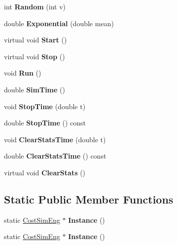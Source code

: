 \begin{DoxyCompactItemize}
int {\bfseries Random} (int v)
\item 
\mbox{\label{classCostSimEng_acc1720c9cdb5febb82759e3548626f0c}} 
double {\bfseries Exponential} (double mean)
\item 
\mbox{\label{classCostSimEng_a99c79de92c4bd410b243c6e9245ebbdf}} 
virtual void {\bfseries Start} ()
\item 
\mbox{\label{classCostSimEng_af799df40b1a3bd7de06b31e4927d5b26}} 
virtual void {\bfseries Stop} ()
\item 
\mbox{\label{classCostSimEng_ae79fd3ec1d850a585d832ef41a0471e5}} 
void {\bfseries Run} ()
\item 
\mbox{\label{classCostSimEng_a874b89eda70f909bd008b9fb4b8847ea}} 
double {\bfseries Sim\+Time} ()
\item 
\mbox{\label{classCostSimEng_a942ec6fc1324614d65f8e18231230990}} 
void {\bfseries Stop\+Time} (double t)
\item 
\mbox{\label{classCostSimEng_a79440b2e2468c8996e24b4a60099d33b}} 
double {\bfseries Stop\+Time} () const
\item 
\mbox{\label{classCostSimEng_a80691746a7c7edb5d12de3d879e3266c}} 
void {\bfseries Clear\+Stats\+Time} (double t)
\item 
\mbox{\label{classCostSimEng_a58be6ebd56f080abf5607c09f99a0f30}} 
double {\bfseries Clear\+Stats\+Time} () const
\item 
\mbox{\label{classCostSimEng_a431e85fcd9c3b40aa8cfc53c01afb6ae}} 
virtual void {\bfseries Clear\+Stats} ()
\end{DoxyCompactItemize}
\subsection*{Static Public Member Functions}
\begin{DoxyCompactItemize}
\item 
\mbox{\label{classCostSimEng_a363989773ba7379ed5039c938520e3d5}} 
static \hyperlink{classCostSimEng}{Cost\+Sim\+Eng} $\ast$ {\bfseries Instance} ()
\item 
\mbox{\label{classCostSimEng_a363989773ba7379ed5039c938520e3d5}} 
static \hyperlink{classCostSimEng}{Cost\+Sim\+Eng} $\ast$ {\bfseries Instance} ()
\end{DoxyCompactItemize}
